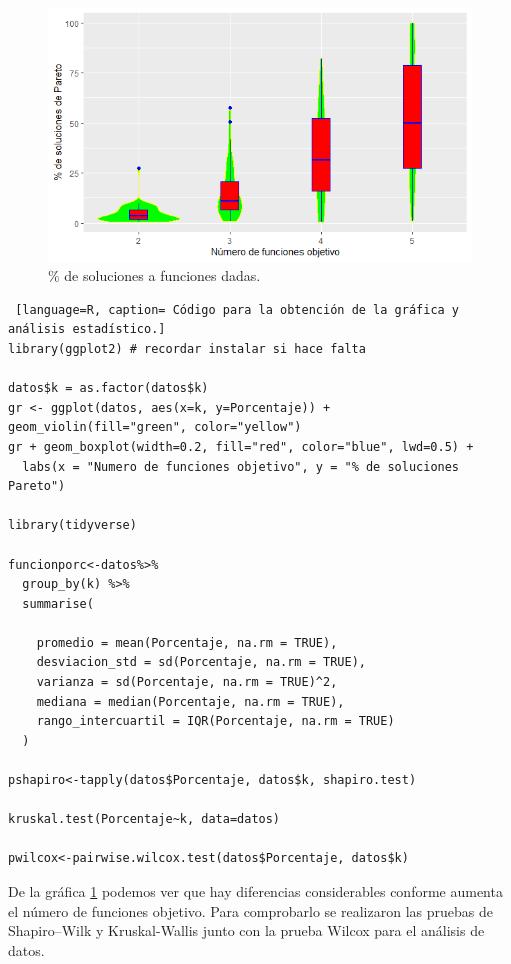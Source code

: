 \documentclass{article}
\begin{document}
\begin{figure} [h!]%
\renewcommand{\figurename}{Gráfica}
    \centering
    \caption{ \% de soluciones a funciones dadas.}
    \label{grafica1}
    \includegraphics[width=150mm]{grafica1.png} %
\end{figure}

\begin{lstlisting} [language=R, caption= Código para la obtención de la gráfica y análisis estadístico.]
library(ggplot2) # recordar instalar si hace falta

datos$k = as.factor(datos$k)
gr <- ggplot(datos, aes(x=k, y=Porcentaje)) + geom_violin(fill="green", color="yellow")
gr + geom_boxplot(width=0.2, fill="red", color="blue", lwd=0.5) +
  labs(x = "Numero de funciones objetivo", y = "% de soluciones Pareto")
  
library(tidyverse)

funcionporc<-datos%>%
  group_by(k) %>%
  summarise(
    
    promedio = mean(Porcentaje, na.rm = TRUE),
    desviacion_std = sd(Porcentaje, na.rm = TRUE),
    varianza = sd(Porcentaje, na.rm = TRUE)^2,
    mediana = median(Porcentaje, na.rm = TRUE),
    rango_intercuartil = IQR(Porcentaje, na.rm = TRUE)
  )

pshapiro<-tapply(datos$Porcentaje, datos$k, shapiro.test)

kruskal.test(Porcentaje~k, data=datos)

pwilcox<-pairwise.wilcox.test(datos$Porcentaje, datos$k)
\end{lstlisting}
De la gráfica \ref{grafica1} podemos ver que hay diferencias considerables conforme aumenta el número de funciones objetivo. Para comprobarlo se realizaron las pruebas de  Shapiro–Wilk \cite{shapiro} y Kruskal-Wallis \cite{Kruskall} junto con la prueba Wilcox \cite{pairwise} para el análisis de datos.
\end{document}
